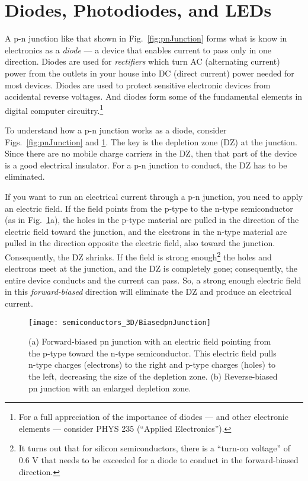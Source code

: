 \section{Diodes, Photodiodes, and LEDs}

A p-n junction like that shown in Fig.~\ref{fig:pnJunction} forms what
is know in electronics as a {\it diode} --- a device that enables
current to pass only in one direction.  Diodes are used for
{\it rectifiers} which turn AC (alternating current) power from the
outlets in your house into DC (direct current) power needed for most
devices.  Diodes are used to protect sensitive electronic devices from
accidental reverse voltages.  And diodes form some of the fundamental
elements in digital computer circuitry.\footnote{For a full appreciation of
the importance of diodes --- and other electronic elements --- consider
PHYS 235 (``Applied Electronics'').}

To understand how a p-n junction works as a diode, consider 
Figs.~\ref{fig:pnJunction} and \ref{fig:BiasedpnJunction}.  The
key is the depletion zone (DZ) at the junction. Since there are no 
mobile charge carriers in the DZ, then that part of the device
is a good electrical insulator. For a p-n junction to conduct, the DZ has to
be eliminated.

If you want to run an electrical 
current through a p-n junction, you need to apply an electric field.
If the field points from the p-type to the n-type semiconductor
(as in Fig.~\ref{fig:BiasedpnJunction}a), the holes in the
p-type material are pulled in the direction of the electric field
toward the junction, and the electrons in the n-type material are
pulled in the direction opposite the electric field, also toward
the junction.  Consequently, the DZ shrinks.
If the field is strong enough\footnote{It turns out that
for silicon semiconductors, there is a ``turn-on voltage'' of
0.6 V that needs to be exceeded for a diode to conduct in the
forward-biased direction.} the holes and electrons meet at the junction,
and the DZ is completely gone; consequently, the entire device
conducts and the current can pass. So, a strong enough electric field
in this {\it forward-biased} direction will eliminate the DZ and
produce an electrical current.

\begin{figure}
\begin{center}
\texttt{[image: semiconductors\_3D/BiasedpnJunction]}
\end{center} 
\caption{(a) Forward-biased pn junction with an electric field
pointing from the p-type toward the n-type semiconductor. This electric
field pulls n-type charges (electrons) to the right and p-type charges
(holes) to the left, decreasing the size of the depletion zone.
(b) Reverse-biased pn junction with an enlarged depletion zone.
} 
\label{fig:BiasedpnJunction} 
\end{figure}


